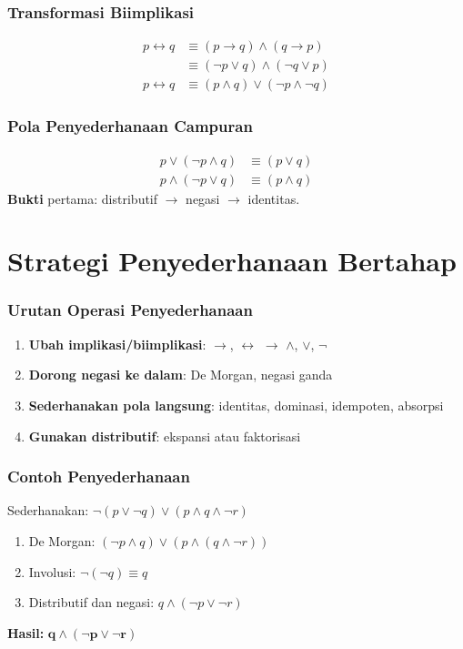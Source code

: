 \documentclass[handout]{beamer}
\theoremstyle{definition}
\theoremstyle{example}
\begin{document}
\begin{frame}
\frametitle{Transformasi Biimplikasi}
\begin{align*}
p \leftrightarrow q &\equiv (p \rightarrow q) \wedge (q \rightarrow p) \\
&\equiv (\neg p \vee q) \wedge (\neg q \vee p) \\
p \leftrightarrow q &\equiv (p \wedge q) \vee (\neg p \wedge \neg q)
\end{align*}
\end{frame}

\begin{frame}
\frametitle{Pola Penyederhanaan Campuran}
\begin{align*}
p \vee (\neg p \wedge q) &\equiv (p \vee q) \\
p \wedge (\neg p \vee q) &\equiv (p \wedge q)
\end{align*}
\textbf{Bukti} pertama: distributif $\to$ negasi $\to$ identitas.
\end{frame}

\section{Strategi Penyederhanaan Bertahap}

\begin{frame}
\frametitle{Urutan Operasi Penyederhanaan}
\begin{enumerate}
  \item \textbf{Ubah implikasi/biimplikasi}: $\rightarrow$, $\leftrightarrow$ $\to$ $\wedge$, $\vee$, $\neg$
  \item \textbf{Dorong negasi ke dalam}: De Morgan, negasi ganda
  \item \textbf{Sederhanakan pola langsung}: identitas, dominasi, idempoten, absorpsi
  \item \textbf{Gunakan distributif}: ekspansi atau faktorisasi
\end{enumerate}
\end{frame}

\begin{frame}
\frametitle{Contoh Penyederhanaan}
Sederhanakan: $\neg(p \vee \neg q) \vee (p \wedge q \wedge \neg r)$
\begin{enumerate}
  \item De Morgan: $(\neg p \wedge q) \vee (p \wedge (q \wedge \neg r))$
  \item Involusi: $\neg(\neg q) \equiv q$
  \item Distributif dan negasi: $q \wedge (\neg p \vee \neg r)$
\end{enumerate}
\textbf{Hasil:} $\mathbf{q \wedge (\neg p \vee \neg r)}$
\end{frame}
\end{document}
